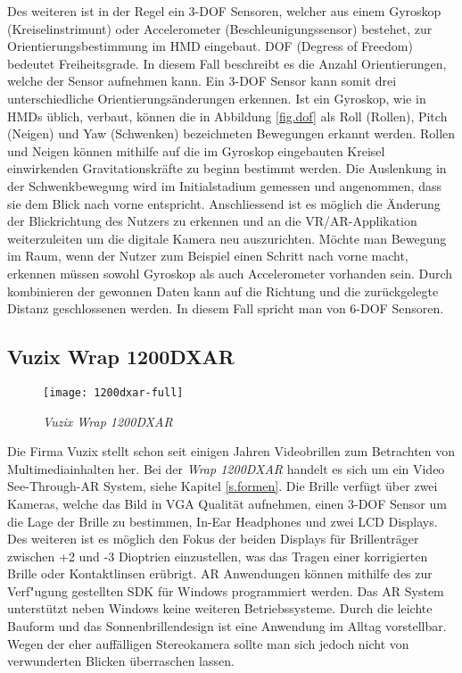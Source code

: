  Des weiteren ist in der Regel ein 3-DOF Sensoren, welcher aus einem Gyroskop (Kreiselinstrimunt) oder Accelerometer (Beschleunigungssensor) bestehet, zur Orientierungsbestimmung im HMD eingebaut. DOF (Degress of Freedom) bedeutet Freiheitsgrade. In diesem Fall beschreibt es die Anzahl Orientierungen, welche der Sensor aufnehmen kann. Ein 3-DOF Sensor kann somit drei unterschiedliche Orientierungsänderungen erkennen. Ist ein Gyroskop, wie in HMDs üblich, verbaut, können die in Abbildung \ref{fig.dof} als Roll (Rollen), Pitch (Neigen) und Yaw (Schwenken) bezeichneten Bewegungen erkannt werden. Rollen und Neigen können mithilfe auf die im Gyroskop eingebauten Kreisel einwirkenden Gravitationskräfte zu beginn bestimmt werden. Die Auslenkung in der Schwenkbewegung wird im Initialstadium gemessen und angenommen, dass sie dem Blick nach vorne entspricht. Anschliessend ist es möglich die Änderung der Blickrichtung des Nutzers zu erkennen und an die VR/AR-Applikation weiterzuleiten um die digitale Kamera neu auszurichten. Möchte man Bewegung im Raum, wenn der Nutzer zum Beispiel einen Schritt nach vorne macht, erkennen müssen sowohl Gyroskop als auch Accelerometer vorhanden sein. Durch kombinieren der gewonnen Daten kann auf die Richtung und die zurückgelegte Distanz geschlossenen werden. In diesem Fall spricht man von 6-DOF Sensoren.\cite{website:dof}
\subsection*{Vuzix Wrap 1200DXAR}
\begin{wrapfigure}{r}{0.5\textwidth}
	\vspace{-20pt}
	\begin{center}
		\texttt{[image: 1200dxar-full]}
	\end{center}
	\vspace{-15pt}
	\caption{\textit{Vuzix Wrap 1200DXAR}}\label{vuzixgraphic}
	\vspace{-12pt}
\end{wrapfigure}
Die Firma Vuzix stellt schon seit einigen Jahren Videobrillen zum Betrachten von Multimediainhalten her. Bei der \textit{Wrap 1200DXAR} handelt es sich um ein Video See-Through-AR System, siehe Kapitel \ref{s.formen}. Die Brille verfügt über zwei Kameras, welche das Bild in VGA Qualität aufnehmen, einen 3-DOF Sensor um die Lage der Brille zu bestimmen, In-Ear Headphones und zwei LCD Displays. Des weiteren ist es möglich den Fokus der beiden Displays für Brillenträger zwischen +2 und -3 Dioptrien einzustellen, was das Tragen einer korrigierten Brille oder Kontaktlinsen erübrigt. AR Anwendungen können mithilfe des zur Verf"ugung gestellten SDK für Windows programmiert werden. Das AR System unterstützt neben Windows keine weiteren Betriebssysteme. Durch die leichte Bauform und das Sonnenbrillendesign ist eine Anwendung im Alltag vorstellbar. Wegen der eher auffälligen Stereokamera sollte man sich jedoch nicht von verwunderten Blicken überraschen lassen. \cite{website:vuzix}
\newpage
